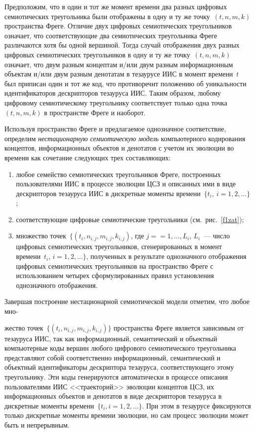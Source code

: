 \begin{multicols}{2}
   Предположим, что в один и тот же момент времени два разных цифровых семиотических 
треугольника были отображены в одну и ту же точку~$(t, n, m, k)$ пространства Фреге. 
Отличие двух цифровых семиотических треугольников означает, что соответствующие два 
семиотических треугольника Фреге различаются хотя бы одной вершиной. Тогда случай 
отображения двух разных цифровых семиотических треугольников в одну и ту же точку~$(t, 
n, m, k)$ означает, что двум разным концептам и/или двум разным информационным 
объектам и/или двум разным денотатам в тезаурусе ИИС в момент времени~$t$ был 
приписан один и тот же код, что противоречит положению об уникальности 
идентификаторов дескрипторов тезауруса ИИС. Таким образом, любому цифровому 
семиотическому треугольнику соответствует только одна точка~$(t, n, m, k)$ в пространстве 
Фреге и наоборот.
   
   Используя пространство Фреге и предлагаемое однозначное соответствие, определим 
\textit{нестационарную семиотическую модель} компьютерного кодирования концептов, 
информационных объектов и денотатов с учетом их эволюции во времени как сочетание 
следующих трех составляющих:
   \begin{enumerate}[(1)]
\item любое семейство семиотических треугольников Фреге, построенных 
пользователями ИИС в процессе эволюции ЦСЗ и описанных ими в виде 
дескрипторов тезауруса ИИС в дискретные моменты времени~$\{t_i, \ i = 1, 2, 
\ldots\}$;
\item соответствующие цифровые семиотические треугольники (см.\ 
рис.~\ref{f1zat});
\item множество точек~$\{(t_i, n_{i,j}, m_{i,j}, k_{i,j})$, где $j=$\linebreak $=1, \ldots , L_i$, $L_i$~--- 
число цифровых семиотических треугольников, сгенерированных в момент 
времени~$t_i$, $i = 1, 2, \ldots\}$, полученных в результате однозначного 
отображения циф\-ро\-вых семиотических треугольников на пространство Фреге с 
использованием четырех сформулированных правил установления однозначного 
отобра\-жения.
\end{enumerate}

   Завершая построение нестационарной се\-миотической модели отметим, что любое 
мно-\linebreak\vspace*{-12pt}
\columnbreak

\noindent
жество точек~$\{(t_i, n_{i,j}, m_{i,j}, k_{i,j})\}$ пространства Фреге яв\-ляется зависимым от 
тезауруса ИИС, так как информационный, семантический и объектный компьютерные коды 
вершин любого цифрового семиотического треугольника представляют собой 
соответственно информационный, семантический и объектный идентификаторы дескриптора 
тезауруса, соответствующего этому треугольнику. Эти коды генерируются автоматически в 
процессе описания пользователями ИИС <<траекторий>> эволюции концептов ЦСЗ, их 
информационных объектов и денотатов в виде дескрипторов тезауруса в дискретные 
моменты времени~$\{t_i, i = 1, 2, \ldots \}$. При этом в тезаурусе фиксируются только 
дискретные моменты времени эволюции, но сам процесс эволюции может быть и 
непрерывным.


\end{multicols}
